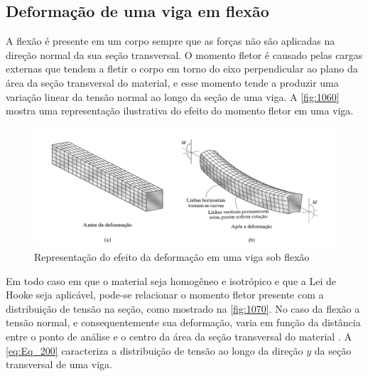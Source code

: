 \subsection{Deformação de uma viga em flexão}

A flexão é presente em um corpo sempre que as forças não são aplicadas na direção normal da sua seção transversal.
O momento fletor é causado pelas cargas externas que tendem a fletir o corpo em torno do eixo perpendicular ao plano da
área da seção transversal do material, e esse momento tende a produzir uma variação linear da tensão normal ao longo da
seção de uma viga. \autocite{Hibbeler2010}
A \autoref{fig:1060} mostra uma representação ilustrativa do efeito do momento fletor em uma viga.

\begin{figure}[htb]
	\caption{\label{fig:1060} Representação do efeito da deformação em uma viga sob flexão}
	\begin{center}
		\includegraphics[width=\textwidth]{pictures/1060.png}
	\end{center}
\end{figure}

Em todo caso em que o material seja homogêneo e isotrópico e que a Lei de Hooke seja aplicável, pode-se relacionar o momento fletor presente com a distribuição de
tensão na seção, como mostrado na \autoref{fig:1070}.
No caso da flexão a tensão normal, e consequentemente sua deformação, varia em função da distância entre o ponto de análise e o centro da área da seção transversal
do material \autocite{Hibbeler2010}.
A \autoref{eq:Eq_200} caracteriza a distribuição de tensão ao longo da direção $ y $ da seção transversal de uma viga.

